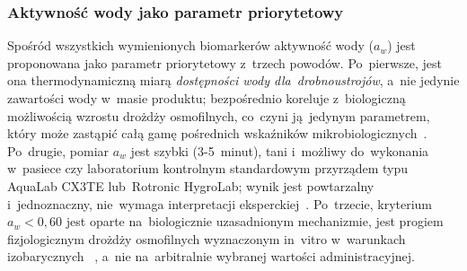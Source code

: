
\subsubsection{Aktywność wody jako parametr priorytetowy}

Spośród wszystkich wymienionych biomarkerów aktywność wody
($a_w$) jest proponowana jako parametr priorytetowy z~trzech
powodów. Po~pierwsze, jest ona thermodynamiczną miarą
\emph{dostępności wody dla~drobnoustrojów}, a~nie jedynie
zawartości wody w~masie produktu; bezpośrednio koreluje
z~biologiczną możliwością wzrostu drożdży osmofilnych,
co~czyni ją~jedynym parametrem, który może zastąpić
całą gamę pośrednich wskaźników mikrobiologicznych~\cite{ruegg1981,waaw2006}.
Po~drugie, pomiar $a_w$ jest szybki (3-5~minut), tani
i~możliwy do~wykonania w~pasiece czy laboratorium kontrolnym
standardowym przyrządem typu AquaLab CX3TE lub~Rotronic
HygroLab; wynik jest powtarzalny i~jednoznaczny,
nie~wymaga interpretacji eksperckiej~\cite{zamora2006}.
Po~trzecie, kryterium $a_w < 0{,}60$ jest oparte
na~biologicznie uzasadnionym mechanizmie, jest progiem
fizjologicznym drożdży osmofilnych wyznaczonym
in~vitro w~warunkach izobarycznych~\cite{waaw2006,ruegg1981}
, a~nie na~arbitralnie wybranej wartości administracyjnej.

